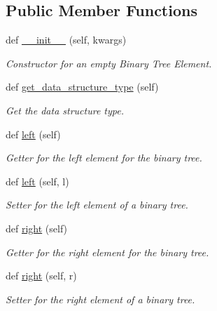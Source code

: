 \subsection*{Public Member Functions}
\begin{DoxyCompactItemize}
\item 
def \hyperlink{classbridges_1_1bin__tree__element_1_1_bin_tree_element_ae08e007089e36e3128f45bb29cd001ec}{\+\_\+\+\_\+init\+\_\+\+\_\+} (self, kwargs)
\begin{DoxyCompactList}\small\item\em Constructor for an empty Binary Tree Element. \end{DoxyCompactList}\item 
def \hyperlink{classbridges_1_1bin__tree__element_1_1_bin_tree_element_a974adfbdb569d77586ecf145197b448b}{get\+\_\+data\+\_\+structure\+\_\+type} (self)
\begin{DoxyCompactList}\small\item\em Get the data structure type. \end{DoxyCompactList}\item 
def \hyperlink{classbridges_1_1bin__tree__element_1_1_bin_tree_element_adb99f8052ef772be4c280970e47e6e0d}{left} (self)
\begin{DoxyCompactList}\small\item\em Getter for the left element for the binary tree. \end{DoxyCompactList}\item 
def \hyperlink{classbridges_1_1bin__tree__element_1_1_bin_tree_element_a8c3fb48d81700421f87a439b030d34fa}{left} (self, l)
\begin{DoxyCompactList}\small\item\em Setter for the left element of a binary tree. \end{DoxyCompactList}\item 
def \hyperlink{classbridges_1_1bin__tree__element_1_1_bin_tree_element_adb7eaa3c67233aa5c368e8907043f451}{right} (self)
\begin{DoxyCompactList}\small\item\em Getter for the right element for the binary tree. \end{DoxyCompactList}\item 
def \hyperlink{classbridges_1_1bin__tree__element_1_1_bin_tree_element_a8a009b8fe2744859abc8bfe89ccce697}{right} (self, r)
\begin{DoxyCompactList}\small\item\em Setter for the right element of a binary tree. \end{DoxyCompactList}\end{DoxyCompactItemize}
